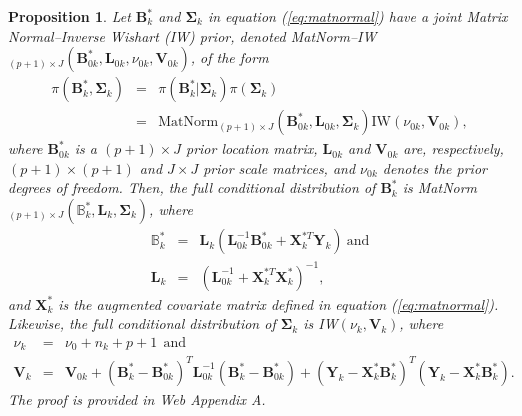 \documentclass[useAMS,usenatbib,referee]{biom}
\newtheorem{prop}{Proposition}
\begin{document}
\begin{prop}
\label{prop1}
Let $\mathbf{B}^*_k$ and $\boldsymbol\Sigma_k$ in equation (\ref{eq:matnormal}) have a joint Matrix Normal--Inverse Wishart (IW) prior, denoted MatNorm--IW$_{(p+1)\times J}(\mathbf{B}^*_{0k},\mathbf{L}_{0k},\nu_{0k},\mathbf{V}_{0k})$, of the form
\begin{eqnarray*}
\pi(\mathbf{B}^*_k,\boldsymbol\Sigma_k)&=&\pi(\mathbf{B}^*_k|\boldsymbol\Sigma_k)\pi(\boldsymbol\Sigma_k)\\
&=&\text{MatNorm}_{(p+1)\times J}(\mathbf{B}^*_{0k},\mathbf{L}_{0k},\boldsymbol\Sigma_k)\text{IW}(\nu_{0k},\mathbf{V}_{0k}),
\end{eqnarray*}
where $\mathbf{B}^*_{0k}$ is a $(p+1)\times J$ prior location matrix, $\mathbf{L}_{0k}$ and $\mathbf{V}_{0k}$ are, respectively, $(p+1)\times(p+1)$ and $J\times J$ prior scale matrices, and $\nu_{0k}$ denotes the prior degrees of freedom. Then, the full conditional distribution of $\mathbf{B}^*_k$ is MatNorm$_{(p+1)\times J}(\mathbb{B}^*_k,\mathbf{L}_k,\boldsymbol\Sigma_k)$, where
\begin{eqnarray*}
	\mathbb{B}^*_k &=& \mathbf{L}_k(\mathbf{L}^{-1}_{0k} \mathbf{B}^*_{0k}+\mathbf{X}^{*T}_k \mathbf{Y}_k) ~ \text{and} \\
	\mathbf{L}_k &=& (\mathbf{L}^{-1}_{0k}+\mathbf{X}^{*T}_k \mathbf{X}^*_k)^{-1},
\end{eqnarray*}
and $\mathbf{X}^*_k$ is the augmented covariate matrix defined in equation (\ref{eq:matnormal}). Likewise, the full conditional distribution of $\boldsymbol\Sigma_k$ is IW$(\nu_k,\mathbf{V}_k)$, where
\begin{eqnarray*}
    \nu_k&=&\nu_0+n_k+p+1~~\text{and}\\
	\mathbf{V}_k &=&  \mathbf{V}_{0k}+ (\mathbf{B}_k^* - \mathbf{B}^*_{0k})^T \mathbf{L}^{-1}_{0k}(\mathbf{B}^*_k - \mathbf{B}^*_{0k}) + (\mathbf{Y}_k-\mathbf{X}^*_k\mathbf{B}^*_k)^T (\mathbf{Y}_k - \mathbf{X}^*_k\mathbf{B}^*_k).
\end{eqnarray*}
The proof is provided in Web Appendix A.
\end{prop}
\end{document}
